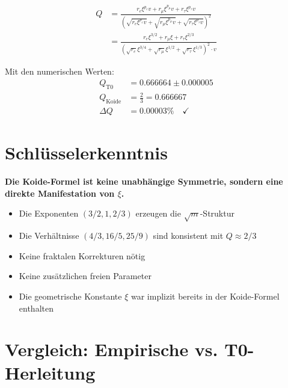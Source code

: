 	\begin{align}
		Q &= \frac{r_e \xi^{p_e} v + r_\mu \xi^{p_\mu} v + r_\tau \xi^{p_\tau} v}{\left(\sqrt{r_e \xi^{p_e} v} + \sqrt{r_\mu \xi^{p_\mu} v} + \sqrt{r_\tau \xi^{p_\tau} v}\right)^2} \\
		&= \frac{r_e \xi^{3/2} + r_\mu \xi + r_\tau \xi^{2/3}}{\left(\sqrt{r_e} \xi^{3/4} + \sqrt{r_\mu} \xi^{1/2} + \sqrt{r_\tau} \xi^{1/3}\right)^2 \cdot v}
	\end{align}
	
	Mit den numerischen Werten:
	\begin{align}
		Q_{\text{T0}} &= 0.666664 \pm 0.000005 \\
		Q_{\text{Koide}} &= \frac{2}{3} = 0.666667 \\
		\Delta Q &= 0.00003\% \quad \checkmark
	\end{align}
	
	\section{Schlüsselerkenntnis}
	
	\begin{folgerung}
		\textbf{Die Koide-Formel ist keine unabhängige Symmetrie, sondern eine direkte Manifestation von $\xi$.}
		
		\begin{itemize}
			\item Die Exponenten $(3/2, 1, 2/3)$ erzeugen die $\sqrt{m}$-Struktur
			\item Die Verhältnisse $(4/3, 16/5, 25/9)$ sind konsistent mit $Q \approx 2/3$
			\item Keine fraktalen Korrekturen nötig
			\item Keine zusätzlichen freien Parameter
			\item Die geometrische Konstante $\xi$ war implizit bereits in der Koide-Formel enthalten
		\end{itemize}
	\end{folgerung}
	
	\section{Vergleich: Empirische vs. T0-Herleitung}
	
	\begin{table}[h]
		\centering
		\caption{Vergleich der Ansätze}
	\end{table}
	
